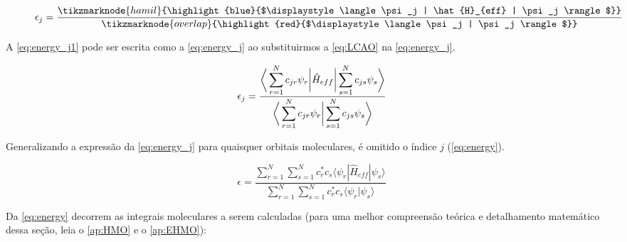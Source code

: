 \begin{figure}[htb]
    \vspace{3\baselineskip}
\begin{equation}
\label{eq:energy_j1}
        \epsilon_j = \frac{\tikzmarknode{hamil}{\highlight{blue}{$\displaystyle \langle \psi_j | \hat{H}_{eff} | \psi_j \rangle$}}}{\tikzmarknode{overlap}{\highlight{red}{$\displaystyle \langle \psi_j | \psi_j \rangle$}}}
\end{equation}
\vspace{2\baselineskip}
\end{figure}

A \autoref{eq:energy_j1} pode ser escrita como a \autoref{eq:energy_j} ao substituirmos a \autoref{eq:LCAO} na \autoref{eq:energy_j}.

\begin{equation}
\label{eq:energy_j}
    \epsilon_j = \frac{ \displaystyle \bigg{\langle} \sum_{r=1}^{N} c_{jr} \psi_r \bigg{|} \hat{H}_{eff} \bigg{|} \sum_{s=1}^{N} c_{js} \psi_s \bigg{\rangle}}{\displaystyle \bigg{\langle} \sum_{r=1}^{N} c_{jr} \psi_r \bigg{|} \sum_{s=1}^{N} c_{js} \psi_s \bigg{\rangle}}
\end{equation}

Generalizando a expressão da \autoref{eq:energy_j} para quaisquer orbitais moleculares, é omitido o índice $j$ (\autoref{eq:energy}).

\begin{equation}
\label{eq:energy}
    \epsilon = \frac{\displaystyle \sum_{r=1}^{N} \sum_{s=1}^{N} c^*_r c_s \langle \psi_r | \hat{H}_{eff} | \psi_s \rangle}{\displaystyle \sum_{r=1}^{N} \sum_{s=1}^{N} c^*_r c_s \langle \psi_r | \psi_s \rangle}
\end{equation}

Da \autoref{eq:energy} decorrem as integrais moleculares a serem calculadas (para uma melhor compreensão teórica e detalhamento matemático dessa seção, leia o \autoref{ap:HMO} e o \autoref{ap:EHMO}):


